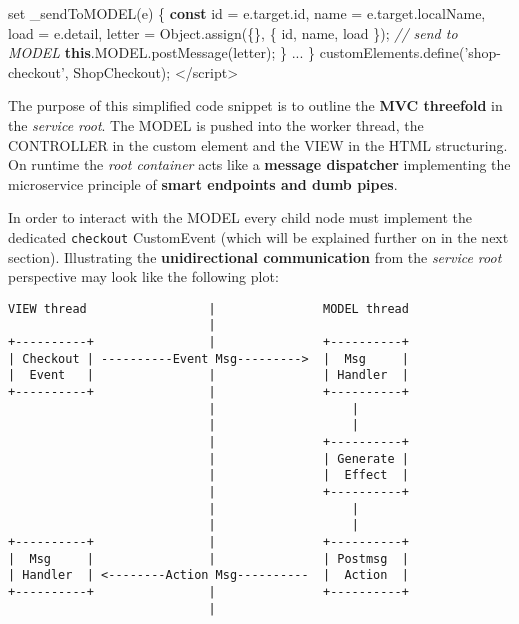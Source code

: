 \documentclass[]{article}
\newenvironment{Shaded}{}{}
\newcommand{\KeywordTok}[1]{\textcolor[rgb]{0.00,0.44,0.13}{\textbf{{#1}}}}
\newcommand{\StringTok}[1]{\textcolor[rgb]{0.25,0.44,0.63}{{#1}}}
\newcommand{\SpecialStringTok}[1]{\textcolor[rgb]{0.73,0.40,0.53}{{#1}}}
\newcommand{\CommentTok}[1]{\textcolor[rgb]{0.38,0.63,0.69}{\textit{{#1}}}}
\newcommand{\VariableTok}[1]{\textcolor[rgb]{0.10,0.09,0.49}{{#1}}}
\newcommand{\OperatorTok}[1]{\textcolor[rgb]{0.40,0.40,0.40}{{#1}}}
\newcommand{\AttributeTok}[1]{\textcolor[rgb]{0.49,0.56,0.16}{{#1}}}
\newcommand{\NormalTok}[1]{{#1}}
\begin{document}
\begin{Shaded}
\begin{Highlighting}[]
  \NormalTok{set }\AttributeTok{_sendToMODEL}\NormalTok{(e) }\OperatorTok{\{}
    \KeywordTok{const} \NormalTok{id }\OperatorTok{=} \VariableTok{e}\NormalTok{.}\VariableTok{target}\NormalTok{.}\AttributeTok{id}\OperatorTok{,} 
          \NormalTok{name }\OperatorTok{=} \VariableTok{e}\NormalTok{.}\VariableTok{target}\NormalTok{.}\AttributeTok{localName}\OperatorTok{,}
          \NormalTok{load }\OperatorTok{=} \VariableTok{e}\NormalTok{.}\AttributeTok{detail}\OperatorTok{,}
          \NormalTok{letter }\OperatorTok{=} \VariableTok{Object}\NormalTok{.}\AttributeTok{assign}\NormalTok{(}\OperatorTok{\{\},} \OperatorTok{\{} \NormalTok{id}\OperatorTok{,} \NormalTok{name}\OperatorTok{,} \NormalTok{load }\OperatorTok{\}}\NormalTok{)}\OperatorTok{;}
    \CommentTok{// send to MODEL}
    \KeywordTok{this}\NormalTok{.}\VariableTok{MODEL}\NormalTok{.}\AttributeTok{postMessage}\NormalTok{(letter)}\OperatorTok{;} 
  \OperatorTok{\}}
  \NormalTok{...}
\OperatorTok{\}}    
\VariableTok{customElements}\NormalTok{.}\AttributeTok{define}\NormalTok{(}\StringTok{'shop-checkout'}\OperatorTok{,} \NormalTok{ShopCheckout)}\OperatorTok{;}
\OperatorTok{<}\SpecialStringTok{/script>}
\end{Highlighting}
\end{Shaded}

The purpose of this simplified code snippet is to outline the
\textbf{MVC threefold} in the \emph{service root}. The MODEL is pushed
into the worker thread, the CONTROLLER in the custom element and the
VIEW in the HTML structuring. On runtime the \emph{root container} acts
like a \textbf{message dispatcher} implementing the microservice
principle of \textbf{smart endpoints and dumb pipes}.

In order to interact with the MODEL every child node must implement the
dedicated \texttt{checkout} CustomEvent (which will be explained further
on in the next section). Illustrating the \textbf{unidirectional
communication} from the \emph{service root} perspective may look like
the following plot:

\begin{verbatim}
VIEW thread                 |               MODEL thread
                            |
+----------+                |               +----------+
| Checkout | ----------Event Msg--------->  |  Msg     |
|  Event   |                |               | Handler  |
+----------+                |               +----------+
                            |                   |
                            |                   |
                            |               +----------+
                            |               | Generate |
                            |               |  Effect  |
                            |               +----------+
                            |                   |
                            |                   |
+----------+                |               +----------+
|  Msg     |                |               | Postmsg  |
| Handler  | <--------Action Msg----------  |  Action  |
+----------+                |               +----------+    
                            |
\end{verbatim}
\end{document}
